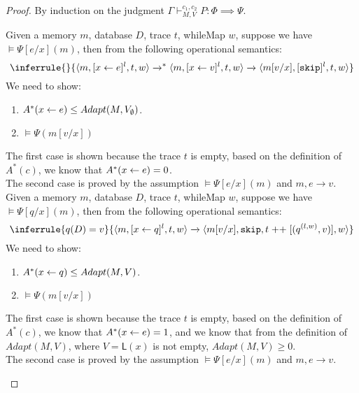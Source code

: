 \documentclass[a4paper,11pt]{article}
\begin{document}
\begin{proof}
 By induction on the judgment $\Gamma \vdash_{M,V}^{c_1, c_2} P: \Phi \implies \Psi$.
\\ 
\begin{itemize}
Given a memory $m$, database $D$, trace $t$, whileMap $w$, suppose we have $\vDash \Psi[e/x](m)$, then from the following operational semantics:
\[\inferrule
{
}
{\config{m, [\assign x e]^{l},  t,w} \xrightarrow{}^{*}
\config{m, [\assign x v]^{l},  t,w} \xrightarrow{} \config{m[v/x], [\eskip]^{l}, t,w}
}\]
We need to show:
\begin{enumerate}
    \item $ A^{*}( \mathrel{ x \leftarrow e } ) \leq Adapt(M, V_{\emptyset}) $.
    \item $\vDash \Psi(m[v/x])$
\end{enumerate}
The first case is shown because the trace $t$ is empty, based on the definition of $A^{*}(c)$, we know that $A^{*}(\mathrel{ x \leftarrow e }) = 0$. \\
The second case is proved by the assumption $\vDash \Psi[e/x](m) $ and $m, e \rightarrow v$.\\

Given a memory $m$, database $D$, trace $t$, whileMap $w$, suppose we have $\vDash \Psi[q/x](m)$, then from the following operational semantics:
\[
\inferrule
{
q(D) = v 
}
{
\config{m, [\assign{x}{q}]^l, t, w} \xrightarrow{} \config{m[ v/ x], \eskip,  t \mathrel{++} [(q^{(l,w )},v)],w }
}
\]
We need to show:
\begin{enumerate}
    \item $ A^{*}( \mathrel{ x \leftarrow q }) \leq Adapt(M, V) $.
    \item $\vDash \Psi(m[v/x])$
\end{enumerate}
The first case is shown because the trace $t$ is empty, based on the definition of $A^{*}(c)$, we know that $A^{*}(\mathrel{ x \leftarrow e }) = 1$, and we know that from the definition of $Adapt(M, V)$, where $V= \mathsf{L}(x)$ is not empty, $Adapt(M, V) \geq 0$.   \\
The second case is proved by the assumption $\vDash \Psi[e/x](m) $ and $m, e \rightarrow v$.\\



\end{itemize}
\end{proof}
\end{document}
